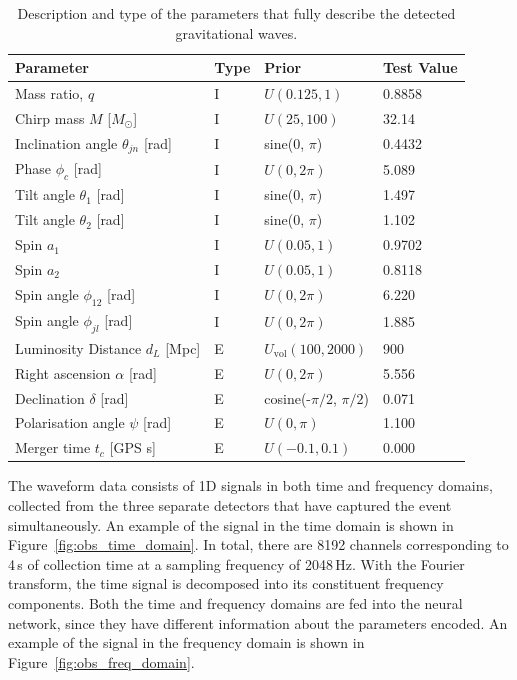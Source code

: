 \begin{table}[htb]
\centering
\begin{tabular}{|l|l|l|l|}
\hline
\textbf{Parameter} & \textbf{Type} & \textbf{Prior} & \textbf{Test Value} \\
\hline
Mass ratio, \( q \) & I & \( U(0.125, 1) \) & 0.8858 \\
Chirp mass \( M \) [\( M_{\odot} \)] & I & \( U(25, 100) \) & 32.14 \\
Inclination angle \( \theta_{jn} \) [rad] & I & sine(0, \( \pi \)) & 0.4432 \\
Phase \( \phi_c \) [rad] & I & \( U(0, 2\pi) \) & 5.089 \\
Tilt angle \( \theta_1 \) [rad] & I & sine(0, \( \pi \)) & 1.497 \\
Tilt angle \( \theta_2 \) [rad] & I & sine(0, \( \pi \)) & 1.102 \\
Spin \( a_1 \) & I & \( U(0.05, 1) \) & 0.9702 \\
Spin \( a_2 \) & I & \( U(0.05, 1) \) & 0.8118 \\
Spin angle \( \phi_{12} \) [rad] & I & \( U(0, 2\pi) \) & 6.220 \\
Spin angle \( \phi_{jl} \) [rad] & I & \( U(0, 2\pi) \) & 1.885 \\
Luminosity Distance \( d_L \) [Mpc] & E & \( U_{\text{vol}}(100, 2000) \) & 900 \\
Right ascension \( \alpha \) [rad] & E & \( U(0, 2\pi) \) & 5.556 \\
Declination \( \delta \) [rad] & E & cosine(-\( \pi/2 \), \( \pi/2 \)) & 0.071 \\
Polarisation angle \( \psi \) [rad] & E & \( U(0, \pi) \) & 1.100 \\
Merger time \( t_c \) [GPS s] & E & \( U(-0.1, 0.1) \) & 0.000 \\
\hline
\end{tabular}
\caption{Description and type of the parameters that fully describe the detected gravitational waves.}
\label{tab:gw_parameters}
\end{table}

The waveform data consists of 1D signals in both time and frequency domains, collected from the three separate detectors that have captured the event simultaneously. An example of the signal in the time domain is shown in Figure~\ref{fig:obs_time_domain}. In total, there are 8192 channels corresponding to 4\,s of collection time at a sampling frequency of 2048\,Hz. With the Fourier transform, the time signal is decomposed into its constituent frequency components. Both the time and frequency domains are fed into the neural network, since they have different information about the parameters encoded. An example of the signal in the frequency domain is shown in Figure~\ref{fig:obs_freq_domain}.

